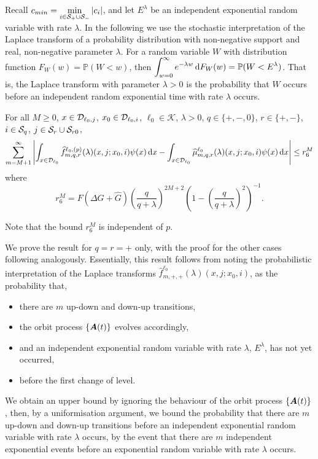Recall \(c_{min} = \min\limits_{i\in\mathcal S_{+}\cup\mathcal{S}_-} |c_i|\), and let \(E^\lambda\) be an independent exponential random variable with rate \(\lambda\). In the following we use the stochastic interpretation of the Laplace transform of a probability distribution with non-negative support and real, non-negative parameter \(\lambda\). For a random variable \(W\) with distribution function \(F_W(w)= \mathbb P(W<w)\), then \(\displaystyle\int_{w=0}^\infty e^{-\lambda w} \, \mathrm{d} F_W(w) = \mathbb P(W < E^{\lambda})\). That is, the Laplace transform with parameter \(\lambda >0\) is the probability that \(W\) occurs before an independent random exponential time with rate \(\lambda\) occurs. 
\begin{lem}\label{lem: gkjljklgagjklagsjlk}For all \(M\geq 0\), \(x\in\mathcal{D}_{\ell_0,j}\), \(x_0\in\mathcal{D}_{\ell_0,i}\), \(\ell_0\in\mathcal K\), \(\lambda > 0\), \(q\in\{+,-,0\}\), \(r\in\{+,-\}\), \(i\in\mathcal{S}_q\), \(j\in\mathcal{S}_r\cup\mathcal{S}_{r0}\),
	\begin{align}
		\sum_{m=M+1}^\infty \left| \int_{x\in\mathcal{D}_{\ell_0}} \widehat f^{\ell_0,(p)}_{m,q,r}(\lambda)(x,j;x_0,i)\psi(x)\, \mathrm{d} x
		-
		\int_{x\in\mathcal{D}_{\ell_0}} \widehat \mu^{\ell_0}_{m,q,r}(\lambda)(x,j;x_0,i)\psi(x) \, \mathrm{d} x\right| \leq r_6^M
	\end{align} 
	where 
	\[r_6^M =  F(\Delta G + \widehat G)\left(\frac{q}{q+\lambda}\right)^{2M+2} \left(1-\left(\frac{q}{q+\lambda}\right)^2\right)^{-1} .\]
\end{lem}
Note that the bound \(r_6^M\) is independent of \(p\). 

We prove the result for \(q=r=+\) only, with the proof for the other cases following analogously. Essentially, this result follows from noting the probabilistic interpretation of the Laplace transforms \(\widehat f^{\ell_0}_{m,+,+}(\lambda)(x,j;x_0,i)\), as the probability that, 
\begin{itemize}
	\item there are \(m\) up-down and down-up transitions, 
	\item the orbit process \(\{\boldsymbol A(t)\}\) evolves accordingly, 
	\item and an independent exponential random variable with rate \(\lambda\), \(E^\lambda\), has not yet occurred,
	\item before the first change of level.
\end{itemize}
We obtain an upper bound by ignoring the behaviour of the orbit process \(\{\boldsymbol A(t)\}\), then, by a uniformisation argument, we bound the probability that there are \(m\) up-down and down-up transitions before an independent exponential random variable with rate \(\lambda\) occurs, by the event that there are \(m\) independent exponential events before an exponential random variable with rate \(\lambda\) occurs.

